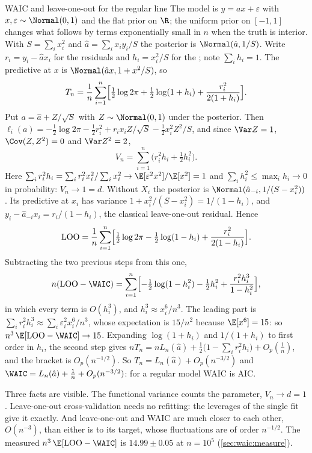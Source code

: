 \begin{refsection}
\begin{computation}{WAIC and leave-one-out for the regular line}\label{comp:waic:regular}
\step The model is $y=ax+\varepsilon$ with $x,\varepsilon\sim\Normal(0,1)$ and the flat prior on $\R$; the uniform prior on $[-1,1]$ changes what follows by terms exponentially small in $n$ when the truth is interior. With $S=\sum_ix_i^2$ and $\hat a=\sum_ix_iy_i/S$ the posterior is $\Normal(\hat a,1/S)$. Write $r_i=y_i-\hat ax_i$ for the residuals and $h_i=x_i^2/S$ for the ; note $\sum_ih_i=1$.
\step The predictive at $x$ is $\Normal(\hat ax,1+x^2/S)$, so
\[
T_n=\frac1n\sum_{i=1}^n\Bigl[\tfrac12\log2\pi+\tfrac12\log(1+h_i)+\frac{r_i^2}{2(1+h_i)}\Bigr].
\]
\step Put $a=\hat a+Z/\sqrt S$ with $Z\sim\Normal(0,1)$ under the posterior. Then $\ell_i(a)=-\tfrac12\log2\pi-\tfrac12r_i^2+r_ix_iZ/\sqrt S-\tfrac12x_i^2Z^2/S$, and since $\Var Z=1$, $\Cov(Z,Z^2)=0$ and $\Var Z^2=2$,
\[
V_n=\sum_{i=1}^n\bigl(r_i^2h_i+\tfrac12h_i^2\bigr).
\]
Here $\sum_ir_i^2h_i=\sum_ir_i^2x_i^2/\sum_ix_i^2\to\E[\varepsilon^2x^2]/\E[x^2]=1$ and $\sum_ih_i^2\le\max_ih_i\to0$ in probability: $V_n\to1=d$.
\step Without $X_i$ the posterior is $\Normal(\hat a_{-i},1/(S-x_i^2))$. Its predictive at $x_i$ has variance $1+x_i^2/(S-x_i^2)=1/(1-h_i)$, and $y_i-\hat a_{-i}x_i=r_i/(1-h_i)$, the classical leave-one-out residual. Hence
\[
\mathrm{LOO}=\frac1n\sum_{i=1}^n\Bigl[\tfrac12\log2\pi-\tfrac12\log(1-h_i)+\frac{r_i^2}{2(1-h_i)}\Bigr].
\]
\step Subtracting the two previous steps from this one,
\[
n(\waicLOO-\WAIC)=\sum_{i=1}^n\Bigl[-\tfrac12\log(1-h_i^2)-\tfrac12h_i^2+\frac{r_i^2h_i^3}{1-h_i^2}\Bigr],
\]
in which every term is $O(h_i^3)$, and $h_i^3\approx x_i^6/n^3$. The leading part is $\sum_ir_i^2h_i^3\approx\sum_i\varepsilon_i^2x_i^6/n^3$, whose expectation is $15/n^2$ because $\E[x^6]=15$: so $n^3\,\E[\waicLOO-\WAIC]\to15$.
\step Expanding $\log(1+h_i)$ and $1/(1+h_i)$ to first order in $h_i$, the second step gives $nT_n=nL_n(\hat a)+\tfrac12\bigl(1-\sum_ir_i^2h_i\bigr)+O_p(\tfrac1n)$, and the bracket is $O_p(n^{-1/2})$. So $T_n=L_n(\hat a)+O_p(n^{-3/2})$ and $\WAIC=L_n(\hat a)+\tfrac1n+O_p(n^{-3/2})$: for a regular model WAIC is AIC.
\end{computation}

Three facts are visible. The functional variance counts the parameter, $V_n\to d=1$. Leave-one-out cross-validation needs no refitting: the leverages of the single fit give it exactly. And leave-one-out and WAIC are much closer to each other, $O(n^{-3})$, than either is to its target, whose fluctuations are of order $n^{-1/2}$. The measured $n^3\,\E[\waicLOO-\WAIC]$ is $14.99\pm0.05$ at $n=10^5$ (\cref{sec:waic:measure}).


\end{refsection}
